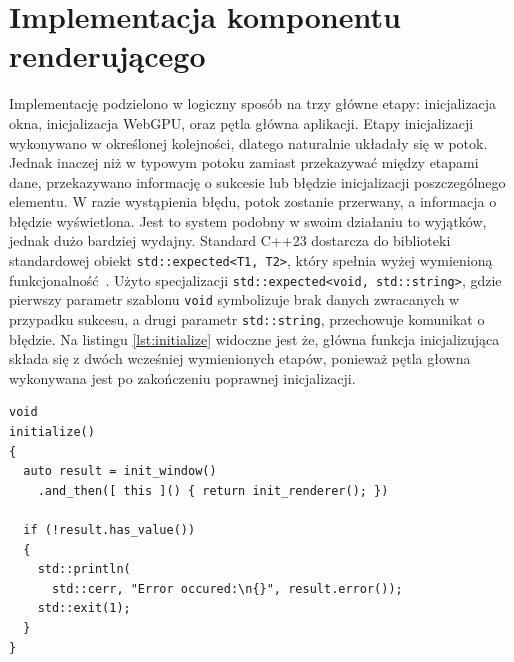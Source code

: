 \section{Implementacja komponentu renderującego}
Implementację podzielono w logiczny sposób na trzy główne etapy: inicjalizacja okna, inicjalizacja WebGPU, oraz pętla główna aplikacji. Etapy inicjalizacji wykonywano w określonej kolejności, dlatego naturalnie układały się w potok. Jednak inaczej niż w typowym potoku zamiast przekazywać między etapami dane, przekazywano informację o sukcesie lub błędzie inicjalizacji poszczególnego elementu. W razie wystąpienia błędu, potok zostanie przerwany, a informacja o błędzie wyświetlona. Jest to system podobny w swoim działaniu to wyjątków, jednak dużo bardziej wydajny. Standard C++23 dostarcza do biblioteki standardowej obiekt \texttt{std::expected<T1, T2>}, który spełnia wyżej wymienioną funkcjonalność~\cite{ISO-IEC-14882-2024}. Użyto specjalizacji \texttt{std::expected<void, std::string>}, gdzie pierwszy parametr szablonu \texttt{void} symbolizuje brak danych zwracanych w przypadku sukcesu, a drugi parametr \texttt{std::string}, przechowuje komunikat o błędzie. Na listingu \ref{lst:initialize} widoczne jest że, główna funkcja inicjalizująca składa się z dwóch wcześniej wymienionych etapów, ponieważ pętla głowna wykonywana jest po zakończeniu poprawnej inicjalizacji. %
\begin{lstlisting}[caption={Funkcja inicjalizująca komponent renderujący}, label={lst:initialize}]
void
initialize()
{
  auto result = init_window()
    .and_then([ this ]() { return init_renderer(); })
  
  if (!result.has_value())
  {
    std::println(
      std::cerr, "Error occured:\n{}", result.error());
    std::exit(1);
  }
}
\end{lstlisting}

